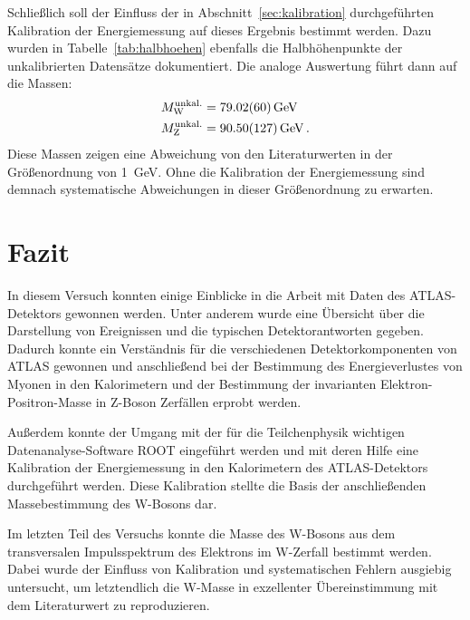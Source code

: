 \documentclass[11pt, a4paper]{article}
\numberwithin{equation}{section}
\begin{document}
Schließlich soll der Einfluss der in Abschnitt~\ref{sec:kalibration} durchgeführten Kalibration der Energiemessung auf dieses Ergebnis bestimmt werden.
Dazu wurden in Tabelle~\ref{tab:halbhoehen} ebenfalls die Halbhöhenpunkte der unkalibrierten Datensätze dokumentiert.
Die analoge Auswertung führt dann auf die Massen:
\begin{align*}
	M_\mathrm{W}^\mathrm{unkal.} &= \SI{79.02 +- 0.60}{\GeV} \\
	M_\mathrm{Z}^\mathrm{unkal.} &= \SI{90.50 +- 1.27}{\GeV} \, \text{.}
\end{align*}
Diese Massen zeigen eine Abweichung von den Literaturwerten in der Größenordnung von \SI{1}{\GeV}.
Ohne die Kalibration der Energiemessung sind demnach systematische Abweichungen in dieser Größenordnung zu erwarten.

\section{Fazit}
In diesem Versuch konnten einige Einblicke in die Arbeit mit Daten des ATLAS-Detektors gewonnen werden.
Unter anderem wurde eine Übersicht über die Darstellung von Ereignissen und die typischen Detektorantworten gegeben.
Dadurch konnte ein Verständnis für die verschiedenen Detektorkomponenten von ATLAS gewonnen und anschließend bei der Bestimmung des Energieverlustes von Myonen in den Kalorimetern und der Bestimmung der invarianten Elektron-Positron-Masse in Z-Boson Zerfällen erprobt werden.

Außerdem konnte der Umgang mit der für die Teilchenphysik wichtigen Daten\-analyse-Software ROOT eingeführt werden und mit deren Hilfe eine Kalibration der Energiemessung in den Kalorimetern des ATLAS-Detektors durchgeführt werden.
Diese Kalibration stellte die Basis der anschließenden Massebestimmung des W-Bosons dar.

Im letzten Teil des Versuchs konnte die Masse des W-Bosons aus dem transversalen Impulsspektrum des Elektrons im W-Zerfall bestimmt werden.
Dabei wurde der Einfluss von Kalibration und systematischen Fehlern ausgiebig untersucht, um letztendlich die W-Masse in exzellenter Übereinstimmung mit dem Literaturwert zu reproduzieren.
\end{document}
